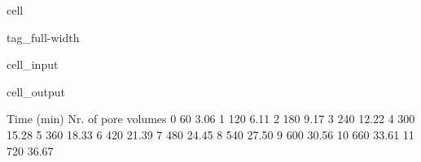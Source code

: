 \documentclass[letterpaper,10pt,english]{jupyterBook}
\begin{document}
\begin{sphinxuseclass}{cell}
\begin{sphinxuseclass}{tag_full-width}
\begin{sphinxVerbatimInput}
\begin{sphinxuseclass}{cell_input}
\begin{sphinxVerbatim}[commandchars=\\\{\}]
 
\end{sphinxVerbatim}

\end{sphinxuseclass}\end{sphinxVerbatimInput}
\begin{sphinxVerbatimOutput}

\begin{sphinxuseclass}{cell_output}
\begin{sphinxVerbatim}[commandchars=\\\{\}]
    Time (min)  Nr. of pore volumes 
0           60                  3.06
1          120                  6.11
2          180                  9.17
3          240                 12.22
4          300                 15.28
5          360                 18.33
6          420                 21.39
7          480                 24.45
8          540                 27.50
9          600                 30.56
10         660                 33.61
11         720                 36.67
\end{sphinxVerbatim}

\noindent{}

\end{sphinxuseclass}\end{sphinxVerbatimOutput}

\end{sphinxuseclass}
\end{sphinxuseclass}
\sphinxAtStartPar
{}
\end{document}
